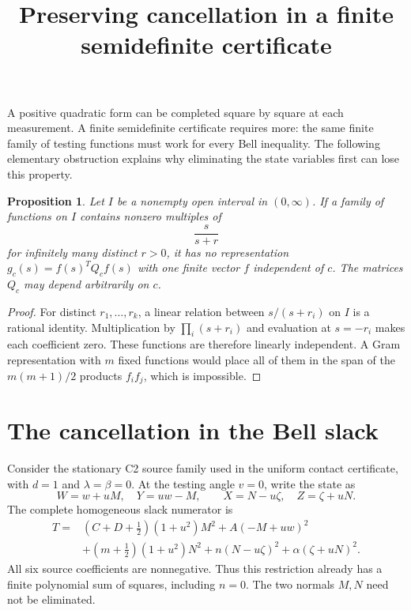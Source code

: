 \documentclass[11pt]{article}
\title{Preserving cancellation in a finite semidefinite certificate}
\author{}
\date{}
\newtheorem{proposition}{Proposition}
\begin{document}
\maketitle
\vspace{-2.2em}

A positive quadratic form can be completed square by square at each
measurement. A finite semidefinite certificate requires more: the same
finite family of testing functions must work for every Bell inequality.
The following elementary obstruction explains why eliminating the state
variables first can lose this property.

\begin{proposition}\label{prop:poles}
Let $I$ be a nonempty open interval in $(0,\infty)$. If a family of
functions on $I$ contains nonzero multiples of
\[
                    \frac{s}{s+r}
\]
for infinitely many distinct $r>0$, it has no representation
$g_c(s)=f(s)^TQ_c f(s)$ with one finite vector $f$ independent of $c$.
The matrices $Q_c$ may depend arbitrarily on $c$.
\end{proposition}
\begin{proof}
For distinct $r_1,\ldots,r_k$, a linear relation between
$s/(s+r_i)$ on $I$ is a rational identity. Multiplication by
$\prod_i(s+r_i)$ and evaluation at $s=-r_i$ makes each coefficient
zero. These functions are therefore linearly independent. A Gram
representation with $m$ fixed functions would place all of them in the
span of the $m(m+1)/2$ products $f_i f_j$, which is impossible.
\end{proof}

\section{The cancellation in the Bell slack}

Consider the stationary C2 source family used in the uniform contact
certificate, with $d=1$ and $\lambda=\beta=0$. At the testing angle
$v=0$, write the state as
\[
 W=w+uM,\quad Y=uw-M,\qquad
 X=N-u\zeta,\quad Z=\zeta+uN.
\]
The complete homogeneous slack numerator is
\begin{align}
 T={}&(C+D+\tfrac12)(1+u^2)M^2+A(-M+uw)^2 \nonumber\\
 &+(m+\tfrac12)(1+u^2)N^2
       +n(N-u\zeta)^2+\alpha(\zeta+uN)^2 .       \label{eq:whole}
\end{align}
All six source coefficients are nonnegative. Thus this restriction
already has a finite polynomial sum of squares, including $n=0$.
The two normals $M,N$ need not be eliminated.
\end{document}
